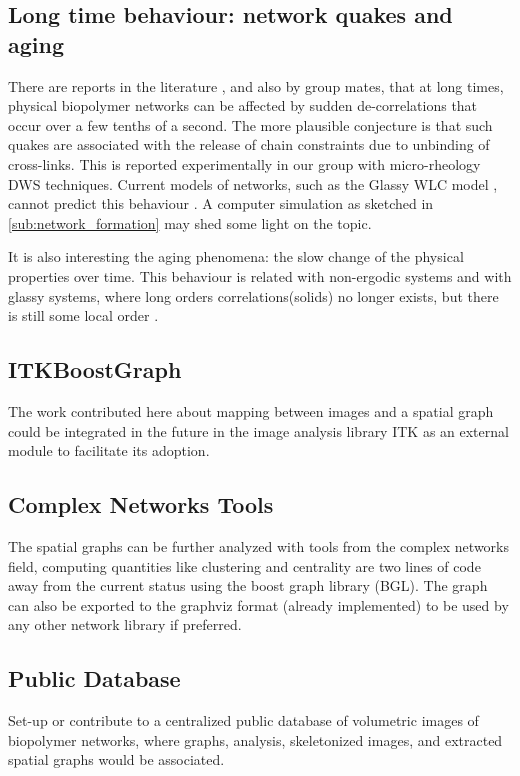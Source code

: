 \subsection{Long time behaviour: network quakes and aging}
\label{sub:quakes}
There are reports in the literature \citep{kajiya_slow_2013}, and also by group
mates\citep{vincent_micro-rheological_2013, mansel_internal_2015}, that at long times, physical
biopolymer networks can be affected by sudden de-correlations that occur over a
few tenths of a second. The more plausible conjecture is that such quakes are associated with the release of
chain constraints due to unbinding of cross-links.  This is reported
experimentally in our group  with micro-rheology DWS techniques.
Current models of networks, such as the Glassy WLC model
\citep{kroy_glassy_2007}, cannot predict this behaviour \citep{vincent_micro-rheological_2013}.  A
computer simulation as sketched in \autoref{sub:network_formation} may shed some light on the topic.

It is also interesting the aging phenomena: the slow change of the physical
properties over time. This behaviour is related with non-ergodic systems and
with glassy systems, where long orders correlations(solids) no longer exists,
but there is still some local order \citep{cipelletti_slow_????}.

\subsection{ITKBoostGraph}%
\label{sub:itkboostgraph}

  The work contributed here about mapping between images and a spatial graph could be integrated in the future in the image analysis library ITK as an external module to facilitate its adoption.

\subsection{Complex Networks Tools}%
\label{sub:complex_networks_tools}

The spatial graphs can be further analyzed with tools from the complex networks field, computing quantities like clustering and centrality are two lines of code away from the current status using the boost graph library (BGL). The graph can also be exported to the graphviz format (already implemented) to be used by any other network library if preferred.

\subsection{Public Database}%
\label{sub:public_database}

  Set-up or contribute to a centralized public database of volumetric images of biopolymer networks, where graphs, analysis, skeletonized images, and extracted spatial graphs would be associated.
